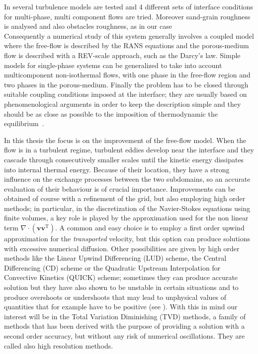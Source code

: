 In \cite{tesi:fetzer} several turbulence models are tested and 4 different sets 
of interface conditions for multi-phase, multi component flows are tried. 
Moreover sand-grain roughness is analysed and also obstacles roughness, as in 
our case\\

Consequently a numerical study of this system generally involves a coupled 
model where the free-flow is described by the RANS equations and the 
porous-medium flow is described with a REV-scale approach, such as the Darcy's 
law. 
Simple models for single-phase systems can be generalized to take 
into account multicomponent non-isothermal flows, with one phase in the 
free-flow region and two phases in the porous-medium. Finally the problem 
has to be closed through suitable coupling conditions imposed at the 
interface; they are usually based on phenomenological arguments in order to 
keep the description simple and they should be as close as possible to the 
imposition of thermodynamic the equilibrium~\cite{paper:mosthaf}.

In this thesis the focus is on the improvement of the free-flow model. When the 
flow is in a turbulent regime, turbulent eddies develop near the interface and 
they cascade through consecutively smaller scales until the kinetic energy 
dissipates into internal thermal energy. Because of their location, they have 
a strong influence on the exchange processes between the two subdomains, so an 
accurate evaluation of their behaviour is of crucial importance. Improvements 
can be obtained of course with a refinement of the grid, but also employing 
high order methods; in 
particular, in the discretization of the Navier-Stokes equations using finite 
volumes, a key role is played by the approximation used for the non linear term 
$\nabla \cdot (\mathbf{v} \mathbf{v}^\mathrm{T})$. A common and easy 
choice is to employ a first order upwind approximation for the 
\emph{transported} velocity, but this option can produce solutions with 
excessive numerical diffusion. Other possibilities are given by high order 
methods 
like the Linear Upwind Differencing (LUD) scheme, the Central Differencing (CD) 
scheme or the Quadratic Upstream Interpolation for Convective Kinetics (QUICK) 
scheme; sometimes they can produce 
accurate solution but they have also shown to be unstable in certain 
situations and to produce overshoots or undershoots that 
may lead to unphysical values of quantities that for example have to be 
positive (see \cite{main:vermal}). With this in mind our interest will be in 
the Total Variation Diminishing (TVD) methods, a family of methods that has 
been derived with the purpose of providing a solution with a second order 
accuracy, but without any risk of numerical oscillations. They are called also 
high resolution methods.

